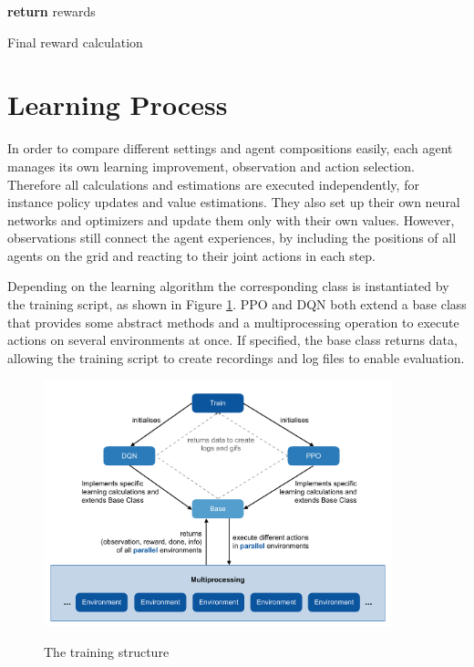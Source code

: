 \begin{algorithm}[H]
    \DontPrintSemicolon
    \textbf{return} rewards\;
    \caption{Final reward calculation}\label{algo:final_reward}
\end{algorithm}


\section{Learning Process}\label{learning_process}
In order to compare different settings and agent compositions easily, each agent manages its own learning improvement, observation and action selection. Therefore all calculations and estimations are executed independently, for instance policy updates and value estimations. They also set up their own neural networks and optimizers and update them only with their own values. However, observations still connect the agent experiences, by including the positions of all agents on the grid and reacting to their joint actions in each step.

Depending on the learning algorithm the corresponding class is instantiated by the training script, as shown in Figure \ref{fig:training}. PPO and DQN both extend a base class that provides some abstract methods and a multiprocessing operation to execute actions on several environments at once. If specified, the base class returns data, allowing the training script to create recordings and log files to enable evaluation.

\begin{figure}[hpbt]
    \centering
    \includegraphics[width=0.9\textwidth]{pictures/training}\\
    \caption[The training structure]{The training structure}\label{fig:training}
\end{figure}

